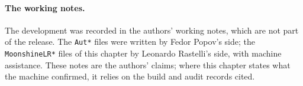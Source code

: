 \paragraph{The working notes.}  The development was recorded in the authors' working notes, which are not part of the
release.  The \texttt{Aut*} files were written by Fedor Popov's side; the \texttt{MoonshineLR*} files of this chapter by
Leonardo Rastelli's side, with machine assistance.  These notes are the authors' claims; where this
chapter states what the machine confirmed, it relies on the build and audit records cited.

\endgroup
